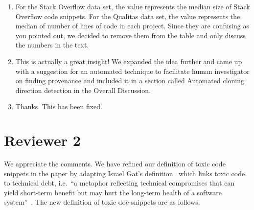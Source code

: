 \documentclass[a4paper,twoside,10pt]{reviewresponse}
\begin{document}
\begin{enumerate} \item For the Stack Overflow data set, the value represents
	the median size of Stack Overflow code snippets. For the Qualitas data set, the
	value represents the median of number of lines of code in each project. Since
	they are confusing as you pointed out, we decided to remove them from the table
	and only discuss the numbers in the text. \item This is actually a great
	insight! We expanded the idea further and came up with a suggestion for an
	automated technique to facilitate human investigator on finding provenance and
	included it in a section called Automated cloning direction detection in the
	Overall Discussion. \item Thanks. This has been fixed. \end{enumerate}

\section{Reviewer 2}


We appreciate the comments. We have refined our definition of toxic code
snippets in the paper by adapting Israel Gat's definition~\citep{toxiccode}
which links toxic code to technical debt, i.e.~``a metaphor reflecting technical
compromises that can yield short-term benefit but may hurt the long-term health
of a software system''~\citep{Li2015}. The new definition of toxic doe snippets
are as follows.
\end{document}
